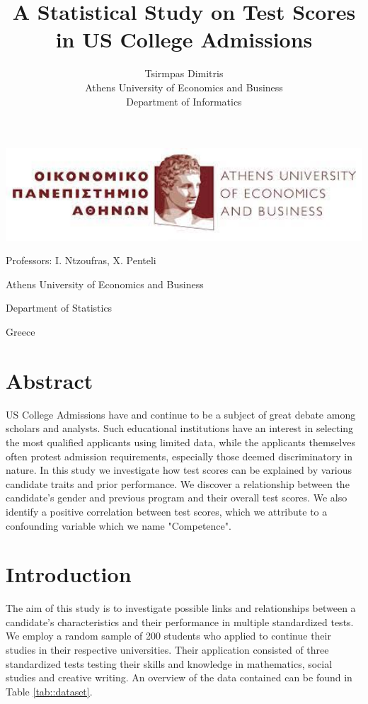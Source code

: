 \documentclass[10pt, a4paper]{article}
\title{\Huge A Statistical Study on Test Scores in US College Admissions }
\author{\LARGE Tsirmpas Dimitris\\Athens University of Economics and Business\\Department of Informatics}
\begin{document}
	
	\begin{titlepage}
		\maketitle
		\begin{center}
					
			\includegraphics[width=1\textwidth]{aueb_logo.jpg}
			
			 \LARGE Professors: I. Ntzoufras, X. Penteli
			
			 \large Athens University of Economics and Business
			
			\large Department of Statistics
			
			\large Greece
		\end{center}
	
	\end{titlepage}
	
	\tableofcontents
	\newpage
	
	\section{Abstract}
	US College Admissions have and continue to be a subject of great debate among scholars and analysts. Such educational institutions have an interest in selecting the most qualified applicants using limited data, while the applicants themselves often protest admission requirements, especially those deemed discriminatory in nature. In this study we investigate how test scores can be explained by various candidate traits and prior performance. We discover a relationship between the candidate's gender and previous program and their overall test scores. We also identify a positive correlation between test scores, which we attribute to a confounding variable which we name "Competence".
	
	
	\section{Introduction}
	
	The aim of this study is to investigate possible links and relationships between a candidate's characteristics and their performance in multiple standardized tests. We employ a random sample of 200 students who applied to continue their studies in their respective universities. Their application consisted of three standardized tests testing their skills and knowledge in mathematics, social studies and creative writing. An overview of the data contained can be found in Table \ref{tab::dataset}. 
	
\end{document}
